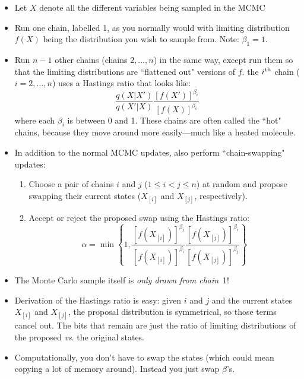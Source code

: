 \begin{itemize}
\item Let $X$ denote all the different variables being sampled in the MCMC
\item Run one chain, labelled 1, as you normally would with limiting distribution $f(X)$ being the distribution you wish to sample from.  Note: $\beta_1 = 1$.
\item Run $n-1$ other chains (chains $2,\ldots,n$) in the same way, except run them so that the limiting distributions  are ``flattened out" versions of $f$. \ie{} the $i^\mathrm{th}$ chain ($i=2,\ldots,n$) uses a Hastings ratio that looks like:
\[
	\frac{q(X|X')}{q(X'|X)} \frac{[f(X')]^{\beta_i}}{[f(X)]^{\beta_i}}
\] 
where each $\beta_i$ is between 0 and 1.  These chains are often called the ``hot" chains, because they move around more easily---much like a heated molecule.
\item In addition to the normal MCMC updates, also perform ``chain-swapping" updates:
\begin{enumerate}
\item Choose a pair of chains $i$ and $j$ ($1\leq i < j \leq n$) at random and propose swapping their current states ($X_{[i]}$ and $X_{[j]}$, respectively).
\item Accept or reject the proposed swap using the Hastings ratio:
\[
	\alpha = \min\left\{
		1, \frac{[f(X_{[i]})]^{\beta_j}}{[f(X_{[i]})]^{\beta_i}}
		\frac{[f(X_{[j]})]^{\beta_i}}{[f(X_{[j]})]^{\beta_j}}
	\right\}
\]
\end{enumerate}
\item The Monte Carlo sample itself is {\em only drawn from chain}~1!
\item Derivation of the Hastings ratio is easy: given $i$ and $j$ and the current states $X_{[i]}$ and $X_{[j]}$, the proposal distribution is symmetrical, so those terms cancel out.  The bits that remain are just the ratio of limiting distributions of the proposed {\em vs}. the original states.
\item Computationally, you don't have to swap the states (which could mean copying a lot of memory around).  Instead you just swap $\beta$'s.
\end{itemize}








